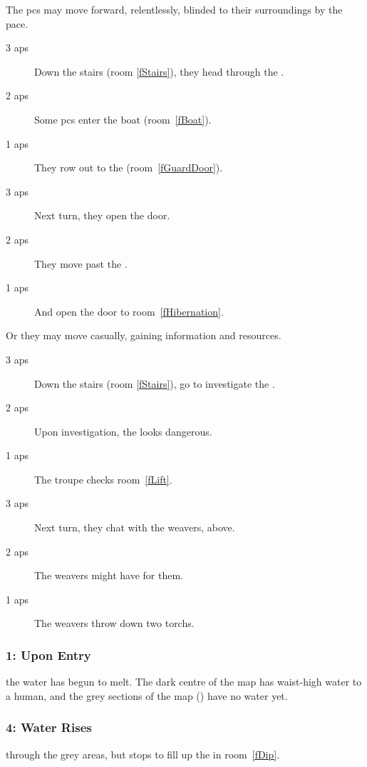 \begin{multicols}{2}
  \noindent
  The \glspl{pc} may move forward, relentlessly, blinded to their surroundings by the pace.
  \begin{description}
    \item[3 \glspl{ap}]
    Down the stairs (room \vref{fStairs}), they head through the .
    \item[2 \glspl{ap}]
    Some \glspl{pc} enter the boat (room~\vref{fBoat}).
    \item[1 \glspl{ap}]
    They row out to the  (room~\ref{fGuardDoor}).
    \item[3 \glspl{ap}]
    Next turn, they open the door.
    \item[2 \glspl{ap}]
    They move past the .
    \item[1 \glspl{ap}]
    And open the door to room~\ref{fHibernation}.
  \end{description}
  \columnbreak
  Or they may move casually, gaining information and resources.
  \begin{description}
    \item[3 \glspl{ap}]
    Down the stairs (room \vref{fStairs}), go to investigate the .
    \item[2 \glspl{ap}]
    Upon investigation, the  looks dangerous.
    \item[1 \glspl{ap}]
    The troupe checks room~\ref{fLift}.
    \item[3 \glspl{ap}]
    Next turn, they chat with the \glspl{weaver}, above.
    \item[2 \glspl{ap}]
    The \glspl{weaver} might have  for them.
    \item[1 \glspl{ap}]
    The \glspl{weaver} throw down two \glspl{torch}.
  \end{description}
\end{multicols}

\subsubsection[Upon Entry]{1: Upon Entry}
the water has begun to melt.
The dark centre of the map has waist-high water to a human, and the grey sections of the map () have no water yet.

\subsubsection[Water Rises]{4: Water Rises}
through the grey areas, but stops to fill up the  in room~\vref{fDip}.

